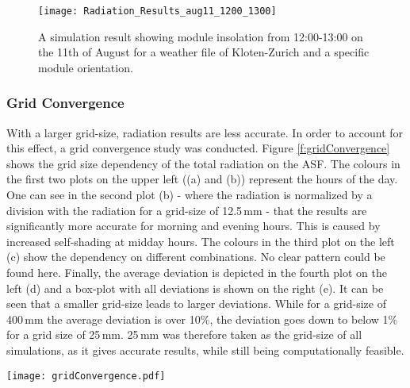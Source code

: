 			\begin{figure}[H]
			\begin{center}
				\texttt{[image: Radiation\_Results\_aug11\_1200\_1300]}
				\caption{A simulation result showing module insolation from 12:00-13:00 on the 11th of August for a weather file of Kloten-Zurich and a specific module orientation.}
				\label{fig:radiation}
			\end{center}
			\end{figure}

			\subsubsection{Grid Convergence}
			\label{ss:gridconvergence}

				With a larger grid-size, radiation results are less accurate. In order to account for this effect, a grid convergence study was conducted. Figure \ref{f:gridConvergence} shows the grid size dependency of the total radiation on the ASF. The colours in the first two plots on the upper left ((a) and (b)) represent the hours of the day. One can see in the second plot (b) - where the radiation is normalized by a division with the radiation for a grid-size of 12.5\,mm - that the results are significantly more accurate for morning and evening hours. This is caused by increased self-shading at midday hours. The colours in the third plot on the left (c) show the dependency on different combinations. No clear pattern could be found here. Finally, the average deviation is depicted in the fourth plot on the left (d) and a box-plot with all deviations is shown on the right (e). It can be seen that a smaller grid-size leads to larger deviations. While for a grid-size of 400\,mm the average deviation is over 10\%, the deviation goes down to below 1\% for a grid size of 25\,mm. 25\,mm was therefore taken as the grid-size of all simulations, as it gives accurate results, while still being computationally feasible. 

				\begin{figure*}
					\begin{center}
					\texttt{[image: gridConvergence.pdf]}
					\caption{Grid convergence evaluation, showing the deviations of the radiation in dependence of the grid size, time of the day and panel orientation. (a) shows the total radiation on the panels in dependence of the hour of the day, (b) depicts the same results, but normalized with a division of the results with the smallest grid-size, (c) presents the influence of the panel orientation, (d) plots the average deviation from the smallest grid-size and (e) visualises all deviations with the usage of box-plots.}
					\label{f:gridConvergence}
					\end{center}
				\end{figure*}


